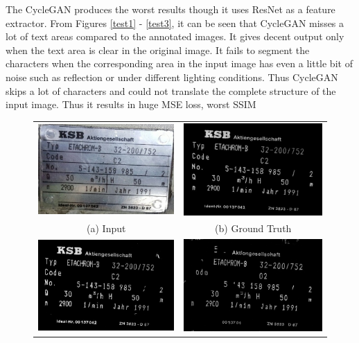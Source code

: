 The CycleGAN produces the worst results though it uses ResNet as a feature extractor. From Figures \ref{test1} - \ref{test3}, it can be seen that CycleGAN misses a lot of text areas compared to the annotated images. It gives decent output only when the text area is clear in the original image. It fails to segment the characters when the corresponding area in the input image has even a little bit of noise such as reflection or under different lighting conditions.  Thus CycleGAN skips a lot of characters and could not translate the complete structure of the input image. Thus it results in huge MSE loss, worst SSIM
\begin{figure}[H]
\begin{tabular}{cc}
\includegraphics[width=65mm]{images/i1.jpg} &   \includegraphics[width=65mm]{images/g1.jpg} \\
(a) Input & (b) Ground Truth \\[6pt]
 \includegraphics[width=65mm]{images/p1.jpg} &   \includegraphics[width=65mm]{images/c1.jpg} \\

\end{tabular}
\end{figure}

